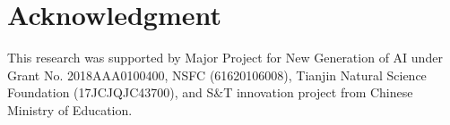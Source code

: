 \documentclass[journal]{IEEEtran}
\begin{document}
\section*{Acknowledgment}
This research was supported by Major Project for New
Generation of AI under Grant No. 2018AAA0100400,
NSFC (61620106008), Tianjin Natural Science Foundation (17JCJQJC43700),
and S\&T innovation project from Chinese Ministry of Education.


\ifCLASSOPTIONcaptionsoff
  \newpage
\fi











\vfill
\end{document}
